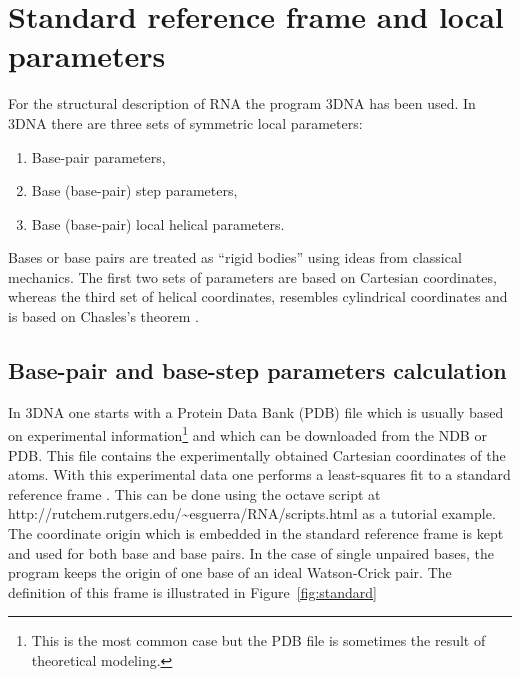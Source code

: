 \section{Standard reference frame and local parameters}
For  the  structural  description  of RNA  the  program  \textsf{3DNA}
\cite{lu2003} has been used.  In \textsf{3DNA} there are three sets of
symmetric local parameters:
\begin{enumerate}
\item Base-pair parameters,
\item Base (base-pair) step parameters,
\item Base (base-pair) local helical parameters.
\end{enumerate}
Bases or base  pairs are treated as ``rigid  bodies'' using ideas from
classical mechanics.
The first two  sets of parameters are based  on Cartesian coordinates,
whereas the  third set  of helical coordinates,  resembles cylindrical
coordinates and is based on Chasles's theorem \cite{babcock1994}.

\subsection{Base-pair and base-step parameters calculation}
In  \textsf{3DNA}   one  starts  with   a  Protein  Data   Bank  (PDB)
\cite{berman2000}  file   which  is  usually   based  on  experimental
information\footnote{This is the most common  case but the PDB file is
  sometimes  the result of  theoretical modeling.}   and which  can be
downloaded from the NDB or  PDB. This file contains the experimentally
obtained Cartesian  coordinates of  the atoms. With  this experimental
data one  performs a least-squares  fit to a standard  reference frame
\cite{olson2001}. This can be done using the \textsf{octave} script at
http://rutchem.rutgers.edu/\~{}esguerra/RNA/scripts.html as a tutorial
example.  The coordinate  origin  which is  embedded  in the  standard
reference frame is kept and used for both base and base pairs.  In the
case of  single unpaired  bases, the program  keeps the origin  of one
base of  an ideal Watson-Crick pair.  The definition of  this frame is
illustrated in Figure~\ref{fig:standard}

